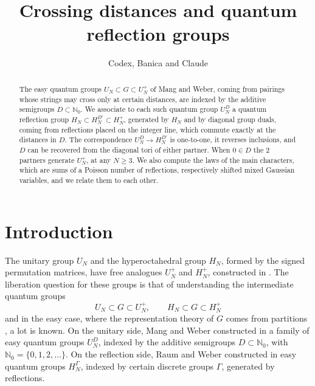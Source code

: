 \documentclass[11pt,a4paper]{article}
\title{Crossing distances and quantum reflection groups}
\author{Codex, Banica and Claude}
\date{}
\begin{document}
\maketitle
\begin{abstract}
The easy quantum groups $U_N\subset G\subset U_N^+$ of Mang and Weber, coming from pairings whose strings may cross only at certain distances, are indexed by the additive semigroups $D\subset\mathbb N_0$. We associate to each such quantum group $U_N^D$ a quantum reflection group $H_N\subset H_N^{D'}\subset H_N^+$, generated by $H_N$ and by diagonal group duals, coming from reflections placed on the integer line, which commute exactly at the distances in $D$. The correspondence $U_N^D\to H_N^{D'}$ is one-to-one, it reverses inclusions, and $D$ can be recovered from the diagonal tori of either partner. When $0\in D$ the 2 partners generate $U_N^+$, at any $N\geq3$. We also compute the laws of the main characters, which are sums of a Poisson number of reflections, respectively shifted mixed Gaussian variables, and we relate them to each other.
\end{abstract}

\medskip
{}
\bigskip

\begingroup
\color{magenta}\hypersetup{linkcolor=magenta}
\setlength{\parskip}{0pt}
\renewcommand{\addvspace}[1]{\vspace{0pt}}
\tableofcontents
\endgroup

\section*{Introduction}

The unitary group $U_N$ and the hyperoctahedral group $H_N$, formed by the signed permutation matrices, have free analogues $U_N^+$ and $H_N^+$, constructed in \cite{bbc,wang}. The liberation question for these groups is that of understanding the intermediate quantum groups
\[
 U_N\subset G\subset U_N^+,\qquad H_N\subset G\subset H_N^+
\]
and in the easy case, where the representation theory of $G$ comes from partitions \cite{bs}, a lot is known. On the unitary side, Mang and Weber constructed in \cite{cyclic,semi} a family of easy quantum groups $U_N^D$, indexed by the additive semigroups $D\subset\mathbb N_0$, with $\mathbb N_0=\{0,1,2,\ldots\}$. On the reflection side, Raum and Weber constructed in \cite{rw,full} easy quantum groups $H_N^\Gamma$, indexed by certain discrete groups $\Gamma$, generated by reflections.
\end{document}
